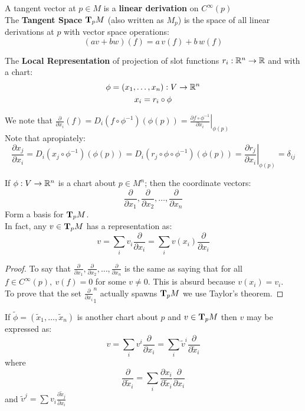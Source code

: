 \begin{ddef}
A tangent vector at $p\in M$ is a \textbf{linear derivation} on $C^\infty(p)$ \\
The \textbf{Tangent Space} $\text{\textbf{T}}_p M$ (also written as $M_p$) is the space of all linear derivations at $p$ with vector space operations: $$ (av+bw)(f) = a\, v(f) + b\, w(f)$$
\end{ddef}

The \textbf{Local Representation} of projection of slot functions $r_i: \mathbb{R}^n \to \mathbb{R}$ and with a chart:
\begin{gather*}
\phi = (x_1,\ldots, x_n): V\to \mathbb{R}^n\\
x_i=r_i\circ\phi
\end{gather*}

We note that $\displaystyle \frac{\partial}{\partial x_i}(f) = D_i(f\circ \phi^{-1})(\phi(p))= \left.\frac{\partial f\circ \phi^{-1}}{\partial x_i} \right|_{\phi(p)}$\\
Note that apropiately: $$\frac{\partial x_j}{\partial x_i} = D_i (x_j\circ \phi^{-1})(\phi(p)) = D_i (r_j\circ \phi \circ \phi^{-1})(\phi(p)) = \left. \frac{\partial r_j}{\partial x_i} \right|_{\phi(p)} =\delta_{ij}$$

\begin{teorema}
If $\phi: V \to \mathbb{R}^n$ is a chart about $p\in M^n$; then the coordinate vectors:
$$\frac{\partial}{\partial x_1},\frac{\partial}{\partial x_2},\ldots, \frac{\partial}{\partial x_n}$$
Form a basis for $\text{\textbf{T}}_p M$.\\ In fact, any $v\in \text{\textbf{T}}_pM$ has a representation as:
$$v = \sum_i v_i \frac{\partial}{\partial x_i} = \sum_i v(x_i) \frac{\partial}{\partial x_i} $$
\begin{proof}
To say that $\frac{\partial}{\partial x_1},\frac{\partial}{\partial x_2},\ldots, \frac{\partial}{\partial x_n}$ is the same as saying that for all $f\in C^\infty(p), \ v(f) =0$ for some $v\neq 0$. This is absurd because $v(x_i)= v_i$. \\
To prove that the set $\frac{\partial}{\partial x_i}_1^n$ actually spawns $\text{\textbf{T}}_pM$ we use Taylor's theorem.
\end{proof}
\end{teorema}

\begin{teorema}
If $\tilde \phi =(\tilde x_1, \ldots , \tilde x_n)$ is another chart about $p$ and $v\in \text{\textbf{T}}_pM$ then $v$ may be expressed as: $$v=\sum_iv^i \frac{\partial}{\partial x_i} = \sum_i \tilde v^i\frac{\partial}{\partial \tilde x_i}$$ 
where $$\frac{\partial}{\partial\tilde x_i} = \sum_i \frac{\partial x_i}{\partial\tilde  x_i}\frac{\partial}{\partial x_i}$$ and $\tilde v^j = \sum v_i \frac{\partial \tilde x_j}{\partial x_i}$
\end{teorema}

